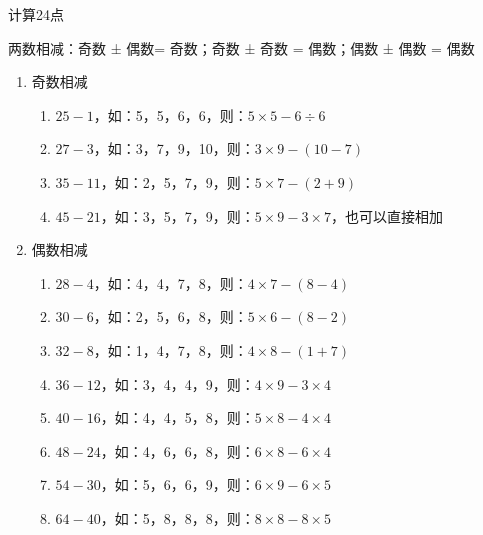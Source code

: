 \documentclass[aspectratio=169]{ctexbeamer} %
\begin{document}
\begin{frame}[t]{计算24点}
\begin{spacing}{1.0}
\normalsize
\alert{两数相减：奇数 ± 偶数= 奇数；奇数 ± 奇数 = 偶数；偶数 ± 偶数 = 偶数}
\begin{enumerate}[label={\arabic*.}]
\item 奇数相减
	\begin{enumerate}[label={\Alph*.}]
	\item $25 - 1$，如：5，5，6，6，则：$5 \times 5 - 6 \div 6$
	\item $27 - 3$，如：3，7，9，10，则：$3 \times 9 - (10 - 7)$
	\item $35 - 11$，如：2，5，7，9，则：$5 \times 7 - (2 + 9)$	
	\item $45 - 21$，如：3，5，7，9，则：$5 \times 9 - 3 \times 7$，也可以直接相加
	\end{enumerate}
\item 偶数相减
	\begin{enumerate}[label={\Alph*.}]
	\item $28 - 4$，如：4，4，7，8，则：$4 \times 7 - (8 - 4)$
	\item $30 - 6$，如：2，5，6，8，则：$5 \times 6 - (8 - 2)$
	\item $32 - 8$，如：1，4，7，8，则：$4 \times 8 - (1 + 7)$
	\item $36 - 12$，如：3，4，4，9，则：$4 \times 9 - 3 \times 4$
	\item $40 - 16$，如：4，4，5，8，则：$5 \times 8 - 4 \times 4$
	\item $48 - 24$，如：4，6，6，8，则：$6 \times 8 - 6 \times 4$
	\item $54 - 30$，如：5，6，6，9，则：$6 \times 9 - 6 \times 5$
	\item $64 - 40$，如：5，8，8，8，则：$8 \times 8 - 8 \times 5$
	\end{enumerate}
\end{enumerate}
\end{spacing}
\end{frame}
\end{document}
